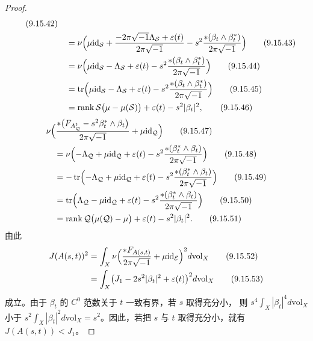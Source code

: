 \begin{proof}
\begin{align}
    \tag{9.15.42}\\
    &\quad=\nu\Bigl(\mu\mathrm{id}_{\mathcal{S}}+\frac{-2\pi\sqrt{-1}\Lambda_{\mathcal{S}}+\varepsilon(t)}{2\pi\sqrt{-1}}
      -s^2\frac{\ast(\beta_t\wedge\beta_t^*)}{2\pi\sqrt{-1}}\Bigr)
    \tag{9.15.43}\\
    &\quad=\nu\Bigl(\mu\mathrm{id}_{\mathcal{S}}-\Lambda_{\mathcal{S}}+\varepsilon(t)
      -s^2\frac{\ast(\beta_t\wedge\beta_t^*)}{2\pi\sqrt{-1}}\Bigr)
    \tag{9.15.44}\\
    &\quad=\operatorname{tr}\Bigl(\mu\mathrm{id}_{\mathcal{S}}-\Lambda_{\mathcal{S}}+\varepsilon(t)
      -s^2\frac{\ast(\beta_t\wedge\beta_t^*)}{2\pi\sqrt{-1}}\Bigr)
    \tag{9.15.45}\\
    &\quad=\operatorname{rank}\mathcal{S}\bigl(\mu-\mu(\mathcal{S})\bigr)+\varepsilon(t)-s^2|\beta_t|^2,
    \tag{9.15.46}
  \end{align}
  \begin{align}
    &\nu\Bigl(\frac{\ast\bigl(F_{A^t_{\mathcal{Q}}}-s^2\beta_t^*\wedge\beta_t\bigr)}{2\pi\sqrt{-1}}+\mu\mathrm{id}_{\mathcal{Q}}\Bigr)
    \tag{9.15.47}\\
    &\quad=\nu\Bigl(-\Lambda_{\mathcal{Q}}+\mu\mathrm{id}_{\mathcal{Q}}+\varepsilon(t)
      -s^2\frac{\ast(\beta_t^*\wedge\beta_t)}{2\pi\sqrt{-1}}\Bigr)
    \tag{9.15.48}\\
    &\quad=-\operatorname{tr}\Bigl(-\Lambda_{\mathcal{Q}}+\mu\mathrm{id}_{\mathcal{Q}}+\varepsilon(t)
      -s^2\frac{\ast(\beta_t^*\wedge\beta_t)}{2\pi\sqrt{-1}}\Bigr)
    \tag{9.15.49}\\
    &\quad=\operatorname{tr}\Bigl(\Lambda_{\mathcal{Q}}-\mu\mathrm{id}_{\mathcal{Q}}+\varepsilon(t)
      -s^2\frac{\ast(\beta_t^*\wedge\beta_t)}{2\pi\sqrt{-1}}\Bigr)
    \tag{9.15.50}\\
    &\quad=\operatorname{rank}\mathcal{Q}\bigl(\mu(\mathcal{Q})-\mu\bigr)+\varepsilon(t)-s^2|\beta_t|^2.
    \tag{9.15.51}
  \end{align}
  由此
  \begin{align}
    J(A(s,t))^2&=\int_X\nu\Bigl(\frac{\ast F_{A(s,t)}}{2\pi\sqrt{-1}}+\mu\mathrm{id}_{\mathcal{E}}\Bigr)^2d\mathrm{vol}_X
    \tag{9.15.52}\\
    &=\int_X\bigl(J_1-2s^2|\beta_t|^2+\varepsilon(t)\bigr)^2d\mathrm{vol}_X
    \tag{9.15.53}
  \end{align}
  成立。由于 $\beta_t$ 的 $C^0$ 范数关于 $t$ 一致有界，若 $s$ 取得充分小，
  则 $s^4\int_X|\beta_t|^4d\mathrm{vol}_X$ 小于 $s^2\int_X|\beta_t|^2d\mathrm{vol}_X=s^2$。因此，若把 $s$ 与 $t$ 取得充分小，就有 $J(A(s,t))<J_1$。
\end{proof}

